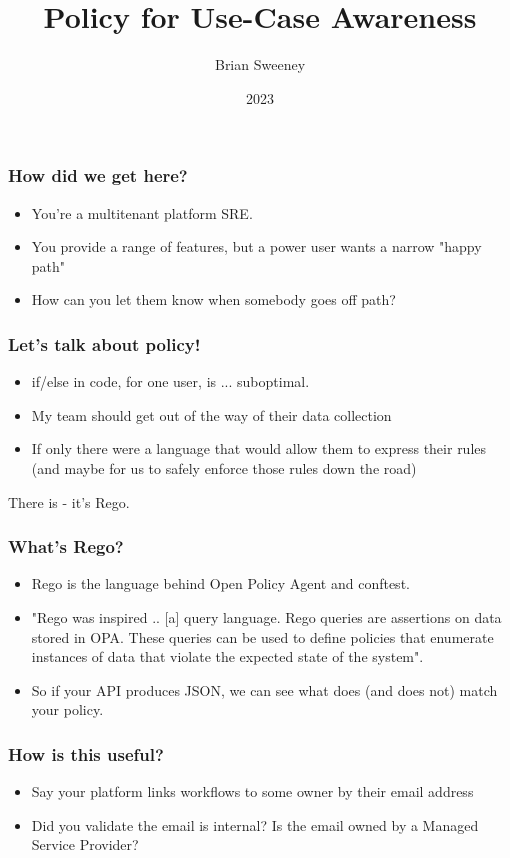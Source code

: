 \documentclass{beamer}
\title{Policy for Use-Case Awareness}
\author{Brian Sweeney}
\institute{Production Engineering (SRE) }
\date{2023}
\begin{document}
\frame{\titlepage}

\begin{frame}
\frametitle{How did we get here?}
\begin{itemize}
  \item You're a multitenant platform SRE.
  \item You provide a range of features, but a power user wants a narrow "happy path"
  \item How can you let them know when somebody goes off path?
\end{itemize}
\end{frame}

\begin{frame}
\frametitle{Let's talk about policy!}
\begin{itemize}
  \item if/else in code, for one user, is  ... suboptimal.
  \item My team should get out of the way of their data collection
  \item If only there were a language that would allow them to express their rules (and maybe for us to safely enforce those rules down the road)
\end{itemize}

There is - it's Rego.
\end{frame}

\begin{frame}
\frametitle{What's Rego?}
\begin{itemize}
  \item Rego is the language behind Open Policy Agent and conftest.
  \item "Rego was inspired .. [a] query language. Rego queries are assertions on data stored in OPA. These queries can be used to define policies that enumerate instances of data that violate the expected state of the system".\footnotemark
  \item So if your API produces JSON, we can see what does (and does not) match your policy.
\end{itemize}

\end{frame}


\begin{frame}
\frametitle{How is this useful?}
\begin{itemize}
  \item Say your platform links workflows to some owner by their email address
  \item Did you validate the email is internal? Is the email owned by a Managed Service Provider?
\end{itemize}

\end{frame}
\end{document}

